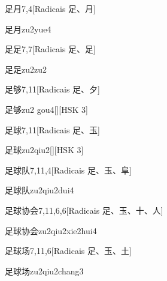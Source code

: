 \begin{entry}{足月}{7,4}[Radicais ⾜、⽉]
  \begin{phonetics}{足月}{zu2yue4}
  \end{phonetics}
\end{entry}

\begin{entry}{足足}{7,7}[Radicais ⾜、⾜]
  \begin{phonetics}{足足}{zu2zu2}
  \end{phonetics}
\end{entry}

\begin{entry}{足够}{7,11}[Radicais ⾜、⼣]
  \begin{phonetics}{足够}{zu2 gou4}[][HSK 3]
  \end{phonetics}
\end{entry}

\begin{entry}{足球}{7,11}[Radicais ⾜、⽟]
  \begin{phonetics}{足球}{zu2qiu2}[][HSK 3]
  \end{phonetics}
\end{entry}

\begin{entry}{足球队}{7,11,4}[Radicais ⾜、⽟、⾩]
  \begin{phonetics}{足球队}{zu2qiu2dui4}
  \end{phonetics}
\end{entry}

\begin{entry}{足球协会}{7,11,6,6}[Radicais ⾜、⽟、⼗、⼈]
  \begin{phonetics}{足球协会}{zu2qiu2xie2hui4}
  \end{phonetics}
\end{entry}

\begin{entry}{足球场}{7,11,6}[Radicais ⾜、⽟、⼟]
  \begin{phonetics}{足球场}{zu2qiu2chang3}
  \end{phonetics}
\end{entry}

